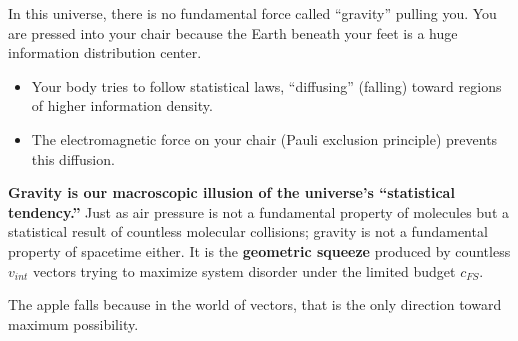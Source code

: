 In this universe, there is no fundamental force called ``gravity'' pulling you. You are pressed into your chair because the Earth beneath your feet is a huge information distribution center.

\begin{itemize}
\item Your body tries to follow statistical laws, ``diffusing'' (falling) toward regions of higher information density.

\item The electromagnetic force on your chair (Pauli exclusion principle) prevents this diffusion.
\end{itemize}

\textbf{Gravity is our macroscopic illusion of the universe's ``statistical tendency.''} Just as air pressure is not a fundamental property of molecules but a statistical result of countless molecular collisions; gravity is not a fundamental property of spacetime either. It is the \textbf{geometric squeeze} produced by countless $v_{int}$ vectors trying to maximize system disorder under the limited budget $c_{FS}$.

The apple falls because in the world of vectors, that is the only direction toward maximum possibility.

